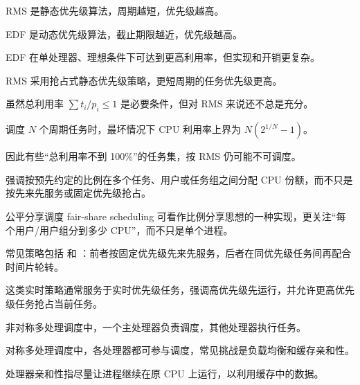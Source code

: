 \begin{points}
  \item RMS 是静态优先级算法，周期越短，优先级越高。
  \item EDF 是动态优先级算法，截止期限越近，优先级越高。
  \item EDF 在单处理器、理想条件下可达到更高利用率，但实现和开销更复杂。
\end{points}


\begin{points}
  \item RMS 采用抢占式静态优先级策略，更短周期的任务优先级更高。
  \item 虽然总利用率 $\sum t_i/p_i \le 1$ 是必要条件，但对 RMS 来说还不总是充分。
  \item 调度 $N$ 个周期任务时，最坏情况下 CPU 利用率上界为 $N(2^{1/N}-1)$。
  \item 因此有些“总利用率不到 100\%”的任务集，按 RMS 仍可能不可调度。
\end{points}


\begin{points}
  \item {}强调按预先约定的比例在多个任务、用户或任务组之间分配 CPU 份额，而不只是按先来先服务或固定优先级抢占。
  \item 公平分享调度 fair-share scheduling 可看作比例分享思想的一种实现，更关注“每个用户/用户组分到多少 CPU”，而不只是单个进程。
  \item {}常见策略包括  和 ：前者按固定优先级先来先服务，后者在同优先级任务间再配合时间片轮转。
  \item 这类实时策略通常服务于实时优先级任务，强调高优先级先运行，并允许更高优先级任务抢占当前任务。
\end{points}


\begin{points}
  \item 非对称多处理调度中，一个主处理器负责调度，其他处理器执行任务。
  \item 对称多处理调度中，各处理器都可参与调度，常见挑战是负载均衡和缓存亲和性。
  \item 处理器亲和性指尽量让进程继续在原 CPU 上运行，以利用缓存中的数据。
\end{points}


